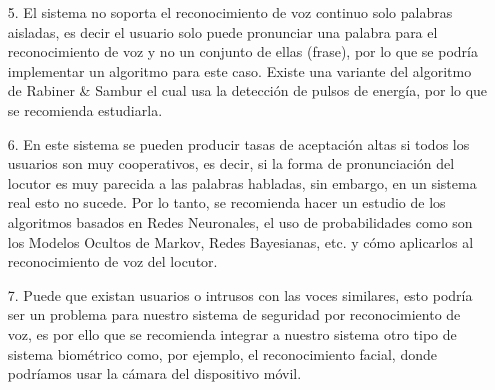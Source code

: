 \begin{enumerate}
\item[5.]El sistema no soporta el reconocimiento de voz continuo solo palabras aisladas, es decir el usuario solo puede pronunciar una palabra para el reconocimiento de voz y no un conjunto de ellas (frase), por lo que se podría implementar un algoritmo para este caso. Existe una variante del algoritmo de Rabiner \& Sambur el cual usa la detección de pulsos de energía, por lo que se recomienda estudiarla.

\item[6.]En este sistema se pueden producir tasas de aceptación altas si todos los usuarios son muy cooperativos, es decir, si la forma de pronunciación del locutor es muy parecida a las palabras habladas, sin embargo, en un sistema real esto no sucede. Por lo tanto, se recomienda hacer un estudio de los algoritmos basados en Redes Neuronales, el uso de probabilidades como son los Modelos Ocultos de Markov, Redes Bayesianas, etc. y cómo aplicarlos al reconocimiento de voz del locutor.

\item[7.]Puede que existan usuarios o intrusos con las voces similares, esto podría ser un problema para nuestro sistema de seguridad por reconocimiento de voz, es por ello que se recomienda integrar a nuestro sistema otro tipo de sistema biométrico como, por ejemplo, el reconocimiento facial, donde podríamos usar la cámara del dispositivo móvil.
\end{enumerate}
